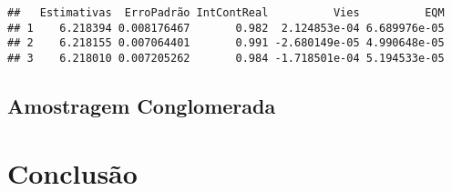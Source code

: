 \documentclass[sn-basic,pdflatex]{sn-jnl}
\theoremstyle{remark}
\theoremstyle{definition}
\begin{document}
\begin{verbatim}
##   Estimativas  ErroPadrão IntContReal          Vies          EQM
## 1    6.218394 0.008176467       0.982  2.124853e-04 6.689976e-05
## 2    6.218155 0.007064401       0.991 -2.680149e-05 4.990648e-05
## 3    6.218010 0.007205262       0.984 -1.718501e-04 5.194533e-05
\end{verbatim}

\hypertarget{amostragem-conglomerada}{%
\subsection{Amostragem Conglomerada}\label{amostragem-conglomerada}}

\hypertarget{conclusuxe3o}{%
\section{Conclusão}\label{conclusuxe3o}}

\renewcommand\refname{Referências}

\end{document}
